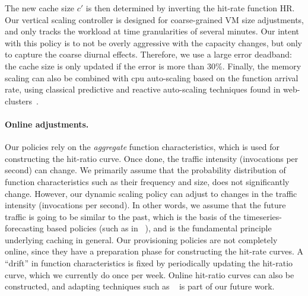 \noindent The new cache size $c'$ is then determined by inverting the hit-rate function $\text{HR}$.
Our vertical scaling controller is designed for coarse-grained VM size adjustments, and only tracks the workload at time granularities of several minutes. 
Our intent with this policy is to not be overly aggressive with the capacity changes, but only to capture the coarse diurnal effects. 
Therefore, we use a large error deadband: the cache size is only updated if the error is more than 30\%. 
Finally, the memory scaling can also be combined with cpu auto-scaling based on the function arrival rate, using classical predictive and reactive auto-scaling techniques found in web-clusters~\cite{gandhi2012autoscale}. 

\paragraph{Online adjustments.} %
Our policies rely on the \emph{aggregate} function characteristics, which is used for constructing the hit-ratio curve. 
Once done, the traffic intensity (invocations per second) can change.
We primarily assume that the probability distribution of function characteristics such as their frequency and size, does not significantly change.
However, our dynamic scaling policy can adjust to changes in the traffic intensity (invocations per second). 
In other words, we assume that the future traffic is going to be similar to the past, which is the basis of the timeseries-forecasting based policies (such as in ~\cite{shahrad_serverless_2020}), and is the fundamental principle underlying caching in general. 
%
Our provisioning policies are not completely online, since they have a preparation phase for constructing the hit-rate curves. 
A ``drift'' in function characteristics is fixed by periodically updating the hit-ratio curve, which we currently do once per week. 
Online hit-ratio curves can also be constructed, and adapting techniques such as ~\cite{zhang2020osca} is part of our future work.









